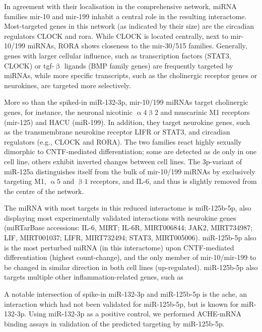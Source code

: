 In agreement with their localisation in the comprehensive network, miRNA families mir-10 and mir-199 inhabit a central role in the resulting interactome. Most-targeted genes in this network (as indicated by their size) are the circadian regulators CLOCK and \acs{rora}. While CLOCK is located centrally, next to mir-10/199 miRNAs, RORA shows closeness to the mir-30/515 families. Generally, genes with larger cellular influence, such as transcription factors (STAT3, CLOCK) or \ac{tgf}-$\upbeta$ ligands (BMP family genes) are frequently targeted by miRNAs, while more specific transcripts, such as the cholinergic receptor genes or neurokines, are targeted more selectively. 

More so than the spiked-in miR-132-3p, mir-10/199 miRNAs target cholinergic genes, for instance, the neuronal nicotinic $\upalpha4\upbeta2$ and muscarinic M1 receptors (mir-125) and HACU (miR-199). In addition, they target neurokine genes, such as the transmembrane neurokine receptor LIFR or STAT3, and circadian regulators (e.g., CLOCK and RORA). The two families react highly sexually dimorphic to CNTF-mediated differentiation; some are detected as \ac{de} only in one cell line, others exhibit inverted changes between cell lines. The 3p-variant of miR-125a distinguishes itself from the bulk of mir-10/199 miRNAs by exclusively targeting M1, $\upalpha5$ and $\upbeta1$ receptors, and IL-6, and thus is slightly removed from the centre of the network. 

The miRNA with most targets in this reduced interactome is miR-125b-5p, also displaying most experimentally validated interactions with neurokine genes (miRTarBase accessions: IL-6, MIRT; IL-6R, MIRT006844; JAK2, MIRT734987; LIF, MIRT001037; LIFR, MIRT732494; \linebreak STAT3, MIRT005006). miR-125b-5p also is the most perturbed miRNA (in this interactome) upon CNTF-mediated differentiation (highest count-change), and the only member of mir-10/mir-199 to be changed in similar direction in both cell lines (up-regulated). miR-125b-5p also targets multiple other inflammation-related genes, such as 

A notable intersection of spike-in miR-132-3p and miR-125b-5p is the \ac{ache}, an interaction which had not been validated for miR-125b-5p, but is known for miR-132-3p\cite{Shaked2009, Shaltiel2013}. Using miR-132-3p as a positive control, we performed ACHE-mRNA binding assays in validation of the predicted targeting by miR-125b-5p.

